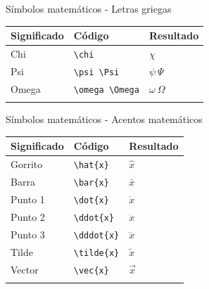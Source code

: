 \documentclass[
  ignorenonframetext,
  aspectratio=169]{beamer}
\begin{document}
\begin{frame}[fragile]{Símbolos matemáticos - Letras griegas}
\label{suxedmbolos-matemuxe1ticos---letras-griegas-3}
\begin{longtable}[]{@{}lll@{}}
\toprule\noalign{}
Significado & Código & Resultado \\
\midrule\noalign{}
\endhead
Chi & \texttt{\textbackslash{}chi} & \(\chi\) \\
Psi & \texttt{\textbackslash{}psi\ \textbackslash{}Psi} &
\(\psi\ \Psi\) \\
Omega & \texttt{\textbackslash{}omega\ \textbackslash{}Omega} &
\(\omega\ \Omega\) \\
\bottomrule\noalign{}
\end{longtable}
\end{frame}

\begin{frame}[fragile]{Símbolos matemáticos - Acentos matemáticos}
\label{suxedmbolos-matemuxe1ticos---acentos-matemuxe1ticos}
\begin{longtable}[]{@{}lll@{}}
\toprule\noalign{}
Significado & Código & Resultado \\
\midrule\noalign{}
\endhead
Gorrito & \texttt{\textbackslash{}hat\{x\}} & \(\hat{x}\) \\
Barra & \texttt{\textbackslash{}bar\{x\}} & \(\bar{x}\) \\
Punto 1 & \texttt{\textbackslash{}dot\{x\}} & \(\dot{x}\) \\
Punto 2 & \texttt{\textbackslash{}ddot\{x\}} & \(\ddot{x}\) \\
Punto 3 & \texttt{\textbackslash{}dddot\{x\}} & \(\dddot{x}\) \\
Tilde & \texttt{\textbackslash{}tilde\{x\}} & \(\tilde{x}\) \\
Vector & \texttt{\textbackslash{}vec\{x\}} & \(\vec{x}\) \\
\bottomrule\noalign{}
\end{longtable}
\end{frame}
\end{document}
